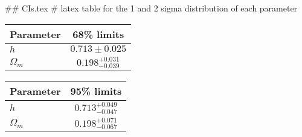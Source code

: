## CIs.tex
# latex table for the 1 and 2 sigma distribution of each parameter

\begin{tabular} { l  c}
 Parameter &  68\% limits\\
\hline
{\boldmath$h              $} & $0.713\pm 0.025            $\\
{\boldmath$\Omega_m       $} & $0.198^{+0.031}_{-0.039}   $\\
\hline
\end{tabular}

\begin{tabular} { l  c}
 Parameter &  95\% limits\\
\hline
{\boldmath$h              $} & $0.713^{+0.049}_{-0.047}   $\\
{\boldmath$\Omega_m       $} & $0.198^{+0.071}_{-0.067}   $\\
\hline
\end{tabular}
